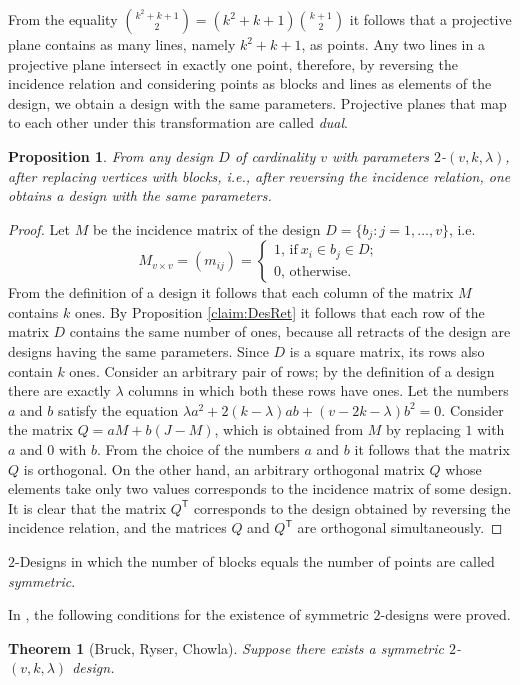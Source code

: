 \documentclass[11pt]{article}
\newtheorem{theorem}{Theorem}[section]
\newtheorem{claim}{Proposition}[section]
\theoremstyle{definition}
\begin{document}
{{{From the equality ${k^2+k+1 \choose 2}=(k^2+k+1){k+1 \choose 2}$ it follows that
a projective plane contains as many lines, namely
$k^2+k+1$, as points. Any two lines in a projective plane
intersect in exactly one point, therefore, by reversing the incidence
relation and considering points as blocks and lines as elements
of the design, we obtain a design with the same parameters. Projective
planes that map to each other under this transformation are called
{\sl dual}.

\begin{claim} From any design $D$ of cardinality $v$ with parameters
$2$-$(v,k,\lambda)$, after replacing vertices with blocks, i.e., after
reversing the incidence relation, one obtains a design with the same
parameters.
\end{claim}
\begin{proof} Let $M$ be the incidence matrix of the design $D=\{b_j : j=1,\dots,v\}$, i.e.
\[
M_{v\times v}=(m_{ij})= \left\{
\begin{array}{l}
1 \mbox{{, if}}\ x_i \in b_j\in D;\\
0\mbox{, otherwise}.
\end{array}
\right.
\]
From the definition of a design it follows that each column of the matrix $M$
contains $k$ ones. By Proposition \ref{claim:DesRet} it follows that
each row of the matrix $D$ contains the same number of ones, because all retracts of the design are designs having the same parameters.
Since $D$ is a square matrix, its rows also contain $k$ ones. Consider an
arbitrary pair of rows; by the definition of a design there are exactly
$\lambda$ columns in which both these rows have ones. Let
the numbers $a$ and $b$ satisfy the equation $\lambda a^2 +
2(k-\lambda)ab+(v-2k-\lambda)b^2=0$. Consider the matrix $Q=aM+b(J-M)$, which
is obtained from $M$ by replacing $1$ with $a$ and $0$ with $b$. From the choice of the numbers
$a$ and $b$ it follows that the matrix $Q$ is orthogonal. On the other hand,
an arbitrary orthogonal matrix $Q$ whose elements take
only two values corresponds to the incidence matrix of some
design. It is clear that the matrix $Q^{\mathsf T}$ corresponds to the design obtained
by reversing the incidence relation, and the matrices $Q$ and $Q^{\mathsf T}$
are orthogonal simultaneously.
\end{proof}

$2$-Designs in which the number of blocks equals the number of points are called {\sl
symmetric}.

In \cite{Chowla}, \cite{Bruck} the following conditions for the
    existence of symmetric
    $2$-designs were proved.
\begin{theorem}[Bruck, Ryser, Chowla]
Suppose there exists a symmetric $2$-$(v,k,\lambda)$ design.


\end{theorem}}}}
\end{document}
